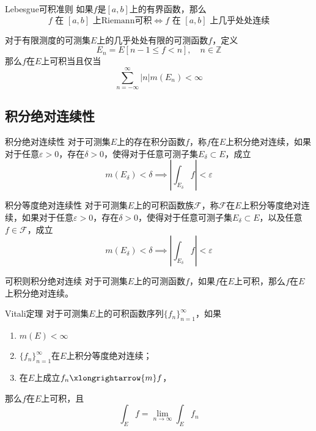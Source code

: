 \documentclass[lang = cn, scheme = chinese, thmcnt = section]{elegantbook}
\newcommand{\Z}{\mathbb{Z}}            %
\newcommand{\sub}{\subset}             %
\newcommand{\tom}{\xlongrightarrow{m}}
\begin{document}
\begin{theorem}{Lebesgue可积准则}
	如果$f$是$[a,b]$上的有界函数，那么%
	$$
	f\text{ 在 }[a,b]\text{ 上Riemann可积}
	\iff
	f\text{ 在 }[a,b]\text{ 上几乎处处连续}
	$$
\end{theorem}

\begin{exercise}
	对于有限测度的可测集$E$上的几乎处处有限的可测函数$f$，定义
	$$
	E_n=E[n-1\le f< n],\quad n\in\Z
	$$
	那么$f$在$E$上可积当且仅当
	$$
	\sum_{n=-\infty}^{\infty}|n|m(E_n)<\infty
	$$
\end{exercise}

\subsection{积分绝对连续性}

\begin{definition}{积分绝对连续性}
	对于可测集$E$上的存在积分函数$f$，称$f$在$E$上积分绝对连续，如果对于任意$\varepsilon>0$，存在$\delta>0$，使得对于任意可测子集$E_\delta\sub E$，成立
	$$
	m(E_\delta)<\delta\implies
	\left| \int_{E_\delta}f \right|<\varepsilon
	$$
\end{definition}

\begin{definition}{积分等度绝对连续性}
	对于可测集$E$上的可积函数族$\mathscr{F}$，称$\mathscr{F}$在$E$上积分等度绝对连续，如果对于任意$\varepsilon>0$，存在$\delta>0$，使得对于任意可测子集$E_\delta\sub E$，以及任意$f\in\mathscr{F}$，成立
	$$
	m(E_\delta)<\delta\implies\left| \int_{E_\delta}f \right|<\varepsilon
	$$
\end{definition}

\begin{theorem}{可积则积分绝对连续}
	对于可测集$E$上的可测函数$f$，如果$f$在$E$上可积，那么$f$在$E$上积分绝对连续。
\end{theorem}

\begin{theorem}{Vitali定理}
	对于可测集$E$上的可积函数序列$\{ f_n \}_{n=1}^{\infty}$，如果
	\begin{enumerate}
		\item $m(E)<\infty$
		\item $\{ f_n \}_{n=1}^{\infty}$在$E$上积分等度绝对连续；
		\item 在$E$上成立$f_n\tom f$，
	\end{enumerate}
	那么$f$在$E$​上可积，且
	$$
	\int_Ef=\lim_{n\to\infty}\int_Ef_n
	$$
\end{theorem}
\end{document}
